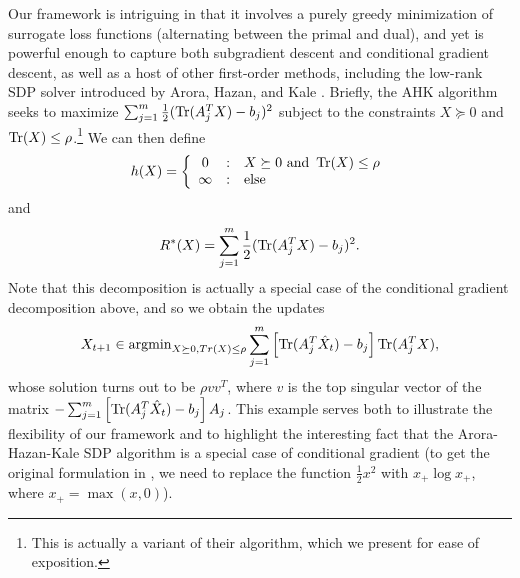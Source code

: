 \documentclass{article} %
\begin{document}
Our framework is intriguing in that it involves a purely greedy minimization 
of surrogate loss functions (alternating between the primal and dual), and yet 
is powerful enough to capture both subgradient descent and conditional gradient 
descent, as well as a host of other first-order methods, including the low-rank 
SDP solver introduced by Arora, Hazan, and Kale \cite{aroraSDP}. Briefly, the 
AHK algorithm seeks to maximize 
$\sum_{j=1}^m \frac{1}{2}(\operatorname{Tr}(A_j^TX)-b_j)^2$ subject to the 
constraints $X \succeq 0$ and $\operatorname{Tr}(X) \leq \rho$.\footnote{This is actually a 
variant of their algorithm, which we present for ease of exposition.} We 
can then define 
\[ h(X) = \left\{ \begin{array}{ccl} 0 & : & X \succeq 0\mathrm{ \ and \ }\operatorname{Tr}(X) \leq \rho \\ \infty & : & \mathrm{else} \end{array} \right.\]
and
\[ R^*(X) = \sum_{j=1}^m \frac{1}{2}(\operatorname{Tr}(A_j^TX)-b_j)^2. \]
Note that this decomposition is actually a special case of the conditional 
gradient decomposition above, and so we obtain the updates 
\[ X_{t+1} \in \operatorname{argmin}_{X \succeq 0, Tr(X) \leq \rho} \sum_{j=1}^m \left[\operatorname{Tr}(A_j^T\hat{X}_t)-b_j\right]\operatorname{Tr}(A_j^TX), \]
whose solution turns out to be $\rho vv^T$, where $v$ is the top singular 
vector of the matrix
$-\sum_{j=1}^m \left[\operatorname{Tr}(A_j^T\hat{X}_t)-b_j\right]A_j$. This example serves both 
to illustrate the flexibility of our framework and to highlight the interesting 
fact that the Arora-Hazan-Kale SDP algorithm is a special case of conditional 
gradient (to get the original formulation in \cite{aroraSDP}, we need to replace 
the function $\frac{1}{2}x^2$ with $x_{+}\log x_{+}$, where $x_{+} = \max(x,0)$).
\end{document}
